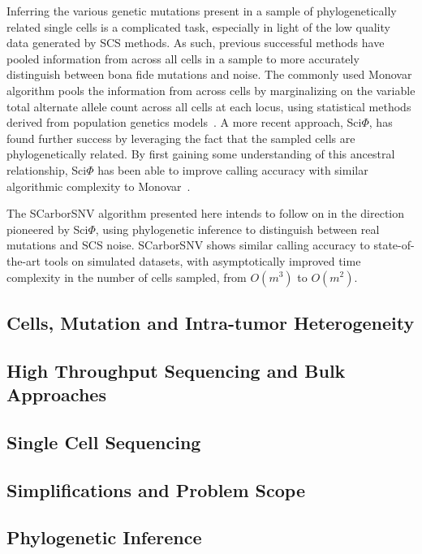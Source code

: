 \documentclass[../main.tex]{subfiles}
\begin{document}
Inferring the various genetic mutations present in a sample of phylogenetically related single cells is a complicated task, especially in light of the low quality data generated by SCS methods.
As such, previous successful methods have pooled information from across all cells in a sample to more accurately distinguish between bona fide mutations and noise.
The commonly used Monovar algorithm pools the information from across cells by marginalizing on the variable total alternate allele count across all cells at each locus, using statistical methods derived from population genetics models~\cite{monovar}.
A more recent approach, Sci$\Phi$, has found further success by leveraging the fact that the sampled cells are phylogenetically related.
By first gaining some understanding of this ancestral relationship, Sci$\Phi$ has been able to improve calling accuracy with similar algorithmic complexity to Monovar~\cite{sciphi}.

The SCarborSNV algorithm presented here intends to follow on in the direction pioneered by Sci$\Phi$, using phylogenetic inference to distinguish between real mutations and SCS noise.
SCarborSNV shows similar calling accuracy to state-of-the-art tools on simulated datasets, with asymptotically improved time complexity in the number of cells sampled, from $O(m^3)$ to $O(m^2)$.

\subsection{Cells, Mutation and Intra-tumor Heterogeneity}


\subsection{High Throughput Sequencing and Bulk Approaches}


\subsection{Single Cell Sequencing}


\subsection{Simplifications and Problem Scope}


\subsection{Phylogenetic Inference}

 
\end{document}
